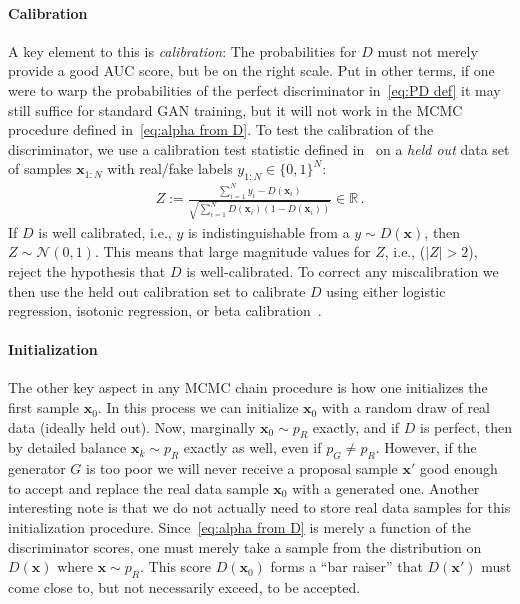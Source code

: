 \documentclass{article}
\renewcommand{\vec}[1]{{\boldsymbol{\mathbf{#1}}}} %
\newcommand{\R}{\mathbb{R}}
\newcommand{\sample}{\sim}
\newcommand{\norm}{\mathcal{N}}
\newcommand{\PG}{{p_G}}
\newcommand{\PR}{{p_R}}
\begin{document}
\paragraph{Calibration}
A key element to this is \emph{calibration}: The probabilities for $D$ must not merely provide a good AUC score, but be on the right scale.
Put in other terms, if one were to warp the probabilities of the perfect discriminator in~\eqref{eq:PD def} it may still suffice for standard GAN training, but it will not work in the MCMC procedure defined in~\eqref{eq:alpha from D}.
To test the calibration of the discriminator, we use a calibration test statistic defined in~\citet{Dawid1997} on a \emph{held out} data set of samples $\vec x_{1:N}$ with real/fake labels $y_{1:N} \in \{0,1\}^N$:
\begin{align}
  Z := \frac{\sum_{i=1}^N y_i - D(\vec x_i)}{\sqrt{\sum_{i=1}^N D(\vec x_i) (1 - D(\vec x_i))}} \in \R\,. \label{eq:calib score}
\end{align}
If $D$ is well calibrated, i.e., $y$ is indistinguishable from a $y \sample D(\vec x)$, then $Z \sample \norm(0,1)$.
This means that large magnitude values for $Z$, i.e., ($|Z| > 2$), reject the hypothesis that $D$ is well-calibrated.
To correct any miscalibration we then use the held out calibration set to calibrate $D$ using either logistic regression, isotonic regression, or beta calibration~\citep{Kull2017}.

\paragraph{Initialization}
The other key aspect in any MCMC chain procedure is how one initializes the first sample $\vec x_0$.
In this process we can initialize $\vec x_0$ with a random draw of real data (ideally held out)\@.
Now, marginally $\vec x_0 \sample \PR$ exactly, and if $D$ is perfect, then by detailed balance $\vec x_k \sample \PR$ exactly as well, even if $\PG \neq \PR$.
However, if the generator $G$ is too poor we will never receive a proposal sample $\vec x'$ good enough to accept and replace the real data sample $\vec x_0$ with a generated one.
Another interesting note is that we do not actually need to store real data samples for this initialization procedure.
Since~\eqref{eq:alpha from D} is merely a function of the discriminator scores, one must merely take a sample from the distribution on $D(\vec x)$ where $\vec x \sample \PR$.
This score $D(\vec x_0)$ forms a ``bar raiser'' that $D(\vec x')$ must come close to, but not necessarily exceed, to be accepted.
\end{document}
